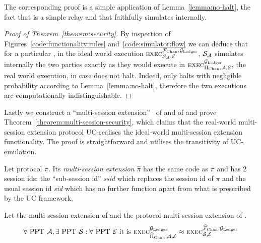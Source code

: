   The corresponding proof is a simple application of
  Lemma~\ref{lemma:no-halt}, the fact that \fchan is a simple relay and that
  \simulator faithfully simulates \pchan internally.

\begin{proof}[Proof of Theorem~\ref{theorem:security}]
  By inspection of Figures~\ref{code:functionality:rules}
  and~\ref{code:simulator:flow} we can deduce that for a particular
  \environment, in the ideal world execution $\textsc{exec}^{\mathcal{F}_{\mathrm{Chan}},
  \mathcal{G}_{\mathrm{Ledger}}}_{\mathcal{S}_{\mathcal{A}}, \mathcal{E}}$, $\mathcal{S}_{\mathcal{A}}$
  simulates internally the two \pchan parties exactly as they would execute in
  $\textsc{exec}^{\mathcal{G}_{\mathrm{Ledger}}}_{\Pi_{\mathrm{Chan}}, \mathcal{A}, \mathcal{E}}$, the real world
  execution, in case \fchan does not halt. Indeed, \fchan only halts with
  negligible probability according to Lemma~\ref{lemma:no-halt}, therefore the
  two executions are computationally indistinguishable.
\end{proof}

  Lastly we construct a ``multi-session
  extension''~\cite{DBLP:conf/crypto/CanettiR03} of \fchan and of \pchan and
  prove Theorem~\ref{theorem:multi-session-security}, which claims that the
  real-world multi-session extension protocol UC-realises the ideal-world
  multi-session extension functionality. The proof is straightforward and
  utilises the transitivity of UC-emulation.

\begin{definition}
  Let protocol $\pi$. Its \emph{multi-session extension} $\hat{\pi}$ has the
  same code as $\pi$ and has 2 session ids: the ``sub-session id''
  \emph{ssid} which replaces the session id of $\pi$ and the usual session id
  \emph{sid} which has no further function apart from what is prescribed by the
  UC framework.
\end{definition}

\begin{theorem}
  \label{theorem:multi-session-security}
  Let \fchanhat the multi-session extension of \fchan and \pchanhat the
  protocol-multi-session extension of \pchan.
  \begin{gather*}
    \forall \text{ PPT } \mathcal{A}, \exists \text{
    PPT } \mathcal{S}: \forall \text{ PPT } \mathcal{E} \text{ it is }
    \textsc{exec}^{\mathcal{G}_{\mathrm{Ledger}}}_{\widehat{\Pi}_{\mathrm{Chan}}, \mathcal{A}, \mathcal{E}} \approx
    \textsc{exec}^{\widehat{\mathcal{F}}_{\mathrm{Chan}}, \mathcal{G}_{\mathrm{Ledger}}}_{\mathcal{S}, \mathcal{E}}
  \end{gather*}
\end{theorem}

